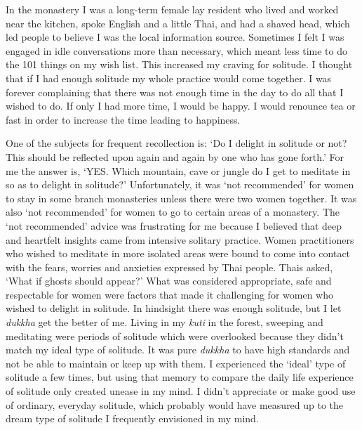 In the monastery I was a long-term female lay resident who lived and
worked near the kitchen, spoke English and a little Thai, and had a
shaved head, which led people to believe I was the local information
source. Sometimes I felt I was engaged in idle conversations more than
necessary, which meant less time to do the 101 things on my wish list.
This increased my craving for solitude. I thought that if I had enough
solitude my whole practice would come together. I was forever
complaining that there was not enough time in the day to do all that I
wished to do. If only I had more time, I would be happy. I would
renounce tea or fast in order to increase the time leading to happiness.

One of the subjects for frequent recollection is: `Do I delight in
solitude or not? This should be reflected upon again and again by one
who has gone forth.' For me the answer is, `YES. Which mountain, cave or
jungle do I get to meditate in so as to delight in solitude?'
Unfortunately, it was `not recommended' for women to stay in some branch
monasteries unless there were two women together. It was also `not
recommended' for women to go to certain areas of a monastery. The `not
recommended' advice was frustrating for me because I believed that deep
and heartfelt insights came from intensive solitary practice. Women
practitioners who wished to meditate in more isolated areas were bound
to come into contact with the fears, worries and anxieties expressed by
Thai people. Thais asked, `What if ghosts should appear?' What was
considered appropriate, safe and respectable for women were factors that
made it challenging for women who wished to delight in solitude. In
hindsight there was enough solitude, but I let \emph{dukkha} get the
better of me. Living in my \emph{kuti} in the forest, sweeping and
meditating were periods of solitude which were overlooked because they
didn't match my ideal type of solitude. It was pure \emph{dukkha} to
have high standards and not be able to maintain or keep up with them. I
experienced the `ideal' type of solitude a few times, but using that
memory to compare the daily life experience of solitude only created
unease in my mind. I didn't appreciate or make good use of ordinary,
everyday solitude, which probably would have measured up to the dream
type of solitude I frequently envisioned in my mind.

